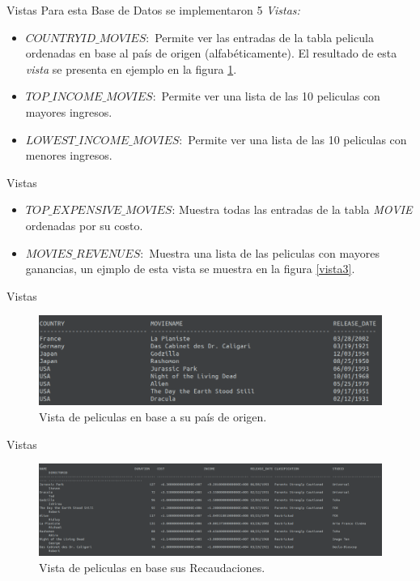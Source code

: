 \documentclass{beamer}%
\begin{document}
\begin{frame}{Vistas}
Para esta Base de Datos se implementaron 5 \textit{Vistas:}
\begin{itemize}
\item $COUNTRYID\_MOVIES:$ Permite ver las entradas de la tabla pelicula ordenadas en base al pa\'is de origen (alfab\'eticamente). El resultado de esta \textit{vista} se presenta en ejemplo en la figura \ref{vista1}.

\item $TOP\_INCOME\_MOVIES:$ Permite ver una lista de las 10 peliculas con mayores ingresos.

\item $LOWEST\_INCOME\_MOVIES:$ Permite ver una lista de las 10 peliculas con menores ingresos.
\end{itemize}
\end{frame}


\begin{frame}{Vistas}
\begin{itemize}
\item $TOP\_EXPENSIVE\_MOVIES$: Muestra todas las entradas de la tabla \textit{MOVIE} ordenadas por su costo.
\item $MOVIES\_REVENUES:$ Muestra una lista de las peliculas con mayores ganancias, un ejmplo de esta vista se muestra en la figura \ref{vista3}.
\end{itemize}
\end{frame}
	

\begin{frame}{Vistas}
\begin{figure}
    \centering
  	\includegraphics[scale=0.3]{figures/screenshot_vista1.png}
  	\caption{Vista de peliculas en base a su pa\'is de origen.} \label{vista1}
\end{figure}

\end{frame}

\begin{frame}{Vistas}
\begin{figure}
    \centering
  	\includegraphics[scale=0.15]{figures/screenshot_vista2.png}
  	\caption{Vista de peliculas en base sus Recaudaciones.} \label{vista2}
\end{figure}
\end{frame}
\end{document}
